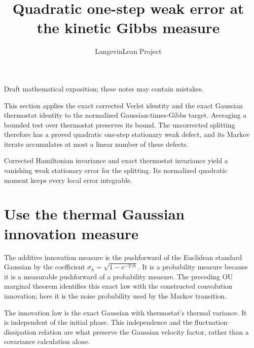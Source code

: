 \documentclass[11pt,a4paper]{article}
\title{\texorpdfstring{Quadratic one-step weak error at the kinetic Gibbs measure}{Quadratic one-step weak error at the kinetic Gibbs measure}}
\author{LangevinLean Project}
\date{}
\begin{document}
\maketitle
Draft mathematical exposition; these notes may contain mistakes.


This section applies the exact corrected Verlet identity and the exact Gaussian thermostat identity to the normalized Gaussian-times-Gibbs target. Averaging a bounded test over thermostat preserves its bound. The uncorrected splitting therefore has a proved quadratic one-step stationary weak defect, and its Markov iterate accumulates at most a linear number of these defects.



Corrected Hamiltonian invariance and exact thermostat invariance yield a vanishing weak stationary error for the splitting. Its normalized quadratic moment keeps every local error integrable.


\section{\texorpdfstring{Use the thermal Gaussian innovation measure}{Use the thermal Gaussian innovation measure}}


The additive innovation measure is the pushforward of the Euclidean standard Gaussian by the coefficient \(\sigma_h=\sqrt{1-e^{-2\gamma h}}\). It is a probability measure because it is a measurable pushforward of a probability measure. The preceding OU marginal theorem identifies this exact law with the constructed convolution innovation; here it is the noise probability used by the Markov transition.



The innovation law is the exact Gaussian with thermostat’s thermal variance. It is independent of the initial phase. This independence and the fluctuation–dissipation relation are what preserve the Gaussian velocity factor, rather than a covariance calculation alone.
\end{document}
